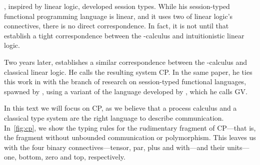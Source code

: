 \documentclass[10pt,a4paper,twocolumn,notitlepage]{article}
\begin{document}
\citet{honda1993}, inspired by linear logic, developed session types.
While his session-typed functional programming language is linear, and it uses
two of linear logic's connectives, there is no direct correspondence.
In fact, it is not until \citeyear{caires2010} that \citeauthor{caires2010}
establish a tight correspondence between the \textpi-calculus and intuitionistic
linear logic.

Two years later, \citet{wadler2012} establishes a similar correspondence between
the \textpi-calculus and classical linear logic. He calls the resulting system
CP. In the same paper, he ties this work in with the branch of research on
session-typed functional languages, spawned by \citet{honda1993}, using a
variant of the language developed by \citet{gay2009}, which he calls GV.

In this text we will focus on CP, as we believe that a process calculus and a
classical type system are the right language to describe communication.
In~\autoref{fig:cp}, we show the typing rules for the rudimentary fragment of
CP---that is, the fragment without unbounded communication or polymorphism.
This leaves us with the four binary connectives---tensor, par, plus and
with---and their units---one, bottom, zero and top, respectively.
\end{document}
